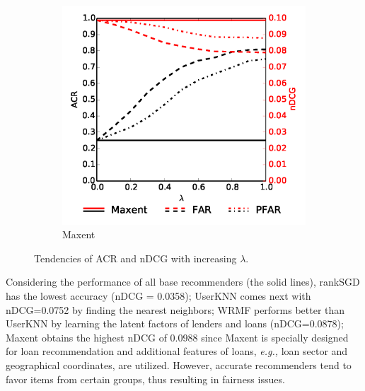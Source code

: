 \begin{figure}
	\begin{subfigure}{0.49\columnwidth} %
		\includegraphics[width=\textwidth]{imgs/far/maxent.png}
		\caption{Maxent \cite{choo2014gather}} %
	\end{subfigure}
	\caption{Tendencies of ACR and nDCG with increasing $\lambda$.\label{fig:kiva_results}} %
\end{figure}


Considering the performance of all base recommenders (the solid lines), rankSGD has the lowest accuracy (nDCG = 0.0358); UserKNN comes next with nDCG=0.0752 by finding the nearest neighbors; WRMF performs better than UserKNN by learning the latent factors of lenders and loans (nDCG=0.0878); Maxent obtains the highest nDCG of 0.0988 since Maxent is specially designed for loan recommendation and additional features of loans, \emph{e.g.,} loan sector and geographical coordinates, are utilized. However, accurate recommenders tend to favor items from certain groups, thus resulting in fairness issues.

